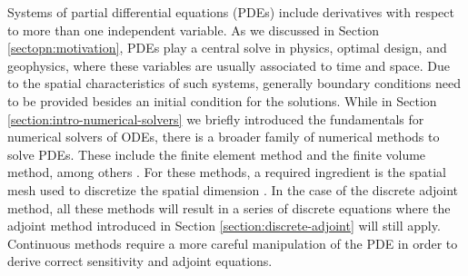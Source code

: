Systems of partial differential equations (PDEs) include derivatives with respect to more than one independent variable. 
As we discussed in Section \ref{sectopn:motivation}, PDEs play a central solve in physics, optimal design, and geophysics, where these variables are usually associated to time and space. 
Due to the spatial characteristics of such systems, generally boundary conditions need to be provided besides an initial condition for the solutions. 
While in Section \ref{section:intro-numerical-solvers} we briefly introduced the fundamentals for numerical solvers of ODEs, there is a broader family of numerical methods to solve PDEs. 
These include the finite element method and the finite volume method, among others \cite{tadmor2012review}. 
For these methods, a required ingredient is the spatial mesh used to discretize the spatial dimension \cite{thompson1998handbook}. 
In the case of the discrete adjoint method, all these methods will result in a series of discrete equations where the adjoint method introduced in Section \ref{section:discrete-adjoint} will still apply. 
Continuous methods require a more careful manipulation of the PDE in order to derive correct sensitivity and adjoint equations. 

